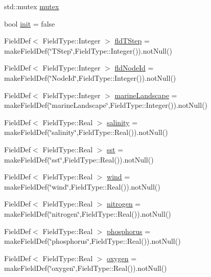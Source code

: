 \begin{DoxyCompactItemize}
\item 
std\+::mutex \mbox{\hyperlink{struct_nodes_envt_table_1_1_impl_a0827a977002e6f8d7b3b0c316c5c973c}{mutex}}
\item 
bool \mbox{\hyperlink{struct_nodes_envt_table_1_1_impl_a3daab98f58db13cc12cb50d8d90b3efc}{init}} = false
\item 
Field\+Def$<$ Field\+Type\+::\+Integer $>$ \mbox{\hyperlink{struct_nodes_envt_table_1_1_impl_a72682f45a2d79373e916adf9a7629675}{fld\+T\+Step}} = make\+Field\+Def(\char`\"{}T\+Step\char`\"{},Field\+Type\+::\+Integer()).not\+Null()
\item 
Field\+Def$<$ Field\+Type\+::\+Integer $>$ \mbox{\hyperlink{struct_nodes_envt_table_1_1_impl_a48ec754f09abc8d0f2eda95b27c9c030}{fld\+Node\+Id}} = make\+Field\+Def(\char`\"{}Node\+Id\char`\"{},Field\+Type\+::\+Integer()).not\+Null()
\item 
Field\+Def$<$ Field\+Type\+::\+Integer $>$ \mbox{\hyperlink{struct_nodes_envt_table_1_1_impl_a3e4eea99df8123d6debd99961b834a03}{marine\+Landscape}} = make\+Field\+Def(\char`\"{}marine\+Landscape\char`\"{},Field\+Type\+::\+Integer()).not\+Null()
\item 
Field\+Def$<$ Field\+Type\+::\+Real $>$ \mbox{\hyperlink{struct_nodes_envt_table_1_1_impl_a267a345e148089ab010036b380c9a3c5}{salinity}} = make\+Field\+Def(\char`\"{}salinity\char`\"{},Field\+Type\+::\+Real()).not\+Null()
\item 
Field\+Def$<$ Field\+Type\+::\+Real $>$ \mbox{\hyperlink{struct_nodes_envt_table_1_1_impl_a40318e2797a84976db33f92985642094}{sst}} = make\+Field\+Def(\char`\"{}sst\char`\"{},Field\+Type\+::\+Real()).not\+Null()
\item 
Field\+Def$<$ Field\+Type\+::\+Real $>$ \mbox{\hyperlink{struct_nodes_envt_table_1_1_impl_a7596d35df8639d90bb7af0e487ead25d}{wind}} = make\+Field\+Def(\char`\"{}wind\char`\"{},Field\+Type\+::\+Real()).not\+Null()
\item 
Field\+Def$<$ Field\+Type\+::\+Real $>$ \mbox{\hyperlink{struct_nodes_envt_table_1_1_impl_a04c7f1f3df57bcc628942d0e223f001c}{nitrogen}} = make\+Field\+Def(\char`\"{}nitrogen\char`\"{},Field\+Type\+::\+Real()).not\+Null()
\item 
Field\+Def$<$ Field\+Type\+::\+Real $>$ \mbox{\hyperlink{struct_nodes_envt_table_1_1_impl_a7c316079dd11ceff2dfd27f99a41ee6d}{phosphorus}} = make\+Field\+Def(\char`\"{}phosphorus\char`\"{},Field\+Type\+::\+Real()).not\+Null()
\item 
Field\+Def$<$ Field\+Type\+::\+Real $>$ \mbox{\hyperlink{struct_nodes_envt_table_1_1_impl_afeb94532a29260a2af3ce82a13c0d5da}{oxygen}} = make\+Field\+Def(\char`\"{}oxygen\char`\"{},Field\+Type\+::\+Real()).not\+Null()

\end{DoxyCompactItemize}

